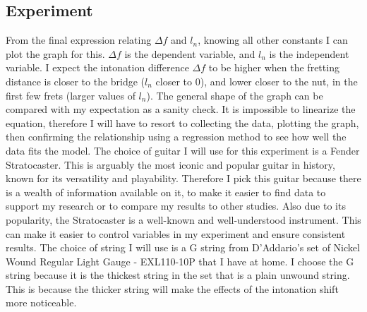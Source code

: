 \documentclass[11pt]{article}
\begin{document}
\begin{flushleft}
    \section{Experiment}
        From the final expression relating $\Delta f$ and $l_n$, knowing all other constants I can plot the graph for this. $\Delta f$ is the dependent variable, and $l_n$ is the independent variable. I expect the intonation difference $\Delta f$ to be higher when the fretting distance is closer to the bridge ($l_n$ closer to 0), and lower closer to the nut, in the first few frets (larger values of $l_n$). The general shape of the graph can be compared with my expectation as a sanity check. It is impossible to linearize the equation, therefore I will have to resort to collecting the data, plotting the graph, then confirming the relationship using a regression method to see how well the data fits the model. 
        The choice of guitar I will use for this experiment is a Fender Stratocaster. This is arguably the most iconic and popular guitar in history, known for its versatility and playability. Therefore I pick this guitar because there is a wealth of information available on it, to make it easier to find data to support my research or to compare my results to other studies. Also due to its popularity, the Stratocaster is a well-known and well-understood instrument. This can make it easier to control variables in my experiment and ensure consistent results.
        The choice of string I will use is a G string from D'Addario's set of Nickel Wound Regular Light Gauge - EXL110-10P that I have at home. I choose the G string because it is the thickest string in the set that is a plain unwound string. This is because the thicker string will make the effects of the intonation shift more noticeable. %

\end{flushleft}
\end{document}

